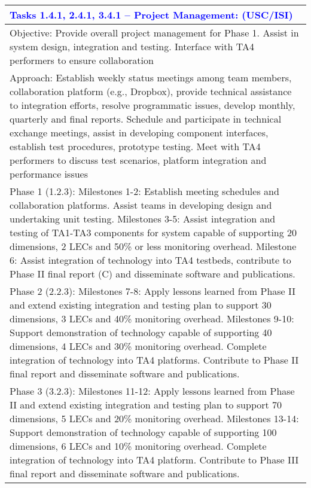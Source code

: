 {\begin{longtable} {|p{\textwidth} | }
\textcolor{blue} {\footnotesize {\textbf{Tasks 1.4.1, 2.4.1, 3.4.1 – Project Management: (USC/ISI)}}} \\ \hline
Objective: Provide overall project management for Phase 1.  Assist in system design, integration and testing.  Interface with TA4 performers to ensure collaboration \\ \hline
Approach:  Establish weekly status meetings among team members, collaboration platform (e.g., Dropbox), provide technical assistance to integration efforts, resolve programmatic issues, develop monthly, quarterly and final reports.  Schedule and participate in technical exchange meetings, assist in developing component interfaces, establish test procedures, prototype testing.  Meet with TA4 performers to discuss test scenarios, platform integration and performance issues \\ \hline
Phase 1 (1.2.3): Milestones 1-2:  Establish meeting schedules and collaboration platforms. Assist teams in developing design and undertaking unit testing.  Milestones 3-5: Assist integration and testing of TA1-TA3 components for system capable of supporting 20 dimensions, 2 LECs and 50\% or less monitoring overhead.   Milestone 6: Assist integration of technology into TA4 testbeds, contribute to Phase II final report (C) and disseminate software and publications. \\ \hline
Phase 2 (2.2.3): Milestones 7-8:  Apply lessons learned from Phase II and extend existing integration and testing plan to support 30 dimensions, 3 LECs and 40\% monitoring overhead.  Milestones 9-10:  Support demonstration of technology capable of supporting 40 dimensions, 4 LECs and 30\% monitoring overhead.  Complete integration of technology into TA4 platforms.  Contribute to Phase II final report and disseminate software and publications. \\ \hline
Phase 3 (3.2.3): Milestones 11-12:  Apply lessons learned from Phase II and extend existing integration and testing plan to support 70 dimensions, 5 LECs and 20\% monitoring overhead.  Milestones 13-14:  Support demonstration of technology capable of supporting 100 dimensions, 6 LECs and 10\% monitoring overhead.  Complete integration of technology into TA4 platform.  Contribute to Phase III final report and disseminate software and publications. \\ \hline
 
\end{longtable}
}



